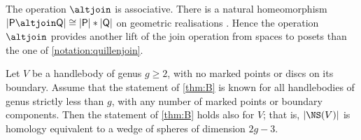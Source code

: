 \begin{rem}
The operation $\altjoin$ is associative. There is a natural homeomorphism $|\mathsf P \altjoin \mathsf Q| \cong |\mathsf P| \ast |\mathsf Q|$ on geometric realisations \cite[Prop.\,1.9]{quillen-homotopyproperties}. Hence the operation~$\altjoin$ provides another lift of the join operation from spaces to posets than the one of \cref{notation:quillenjoin}.
\end{rem}

\begin{prop}\label{final prop}Let $V$ be a handlebody of genus $g \geq 2$, with no marked points or discs on its boundary. Assume that the statement of \cref{thm:B} is known for all handlebodies of genus strictly less than $g$, with any number of marked points or boundary components. Then the statement of \cref{thm:B} holds also for $V$; that is, $|\NS(V)|$ is homology equivalent to a wedge of spheres of dimension $2g-3$.
\end{prop}

